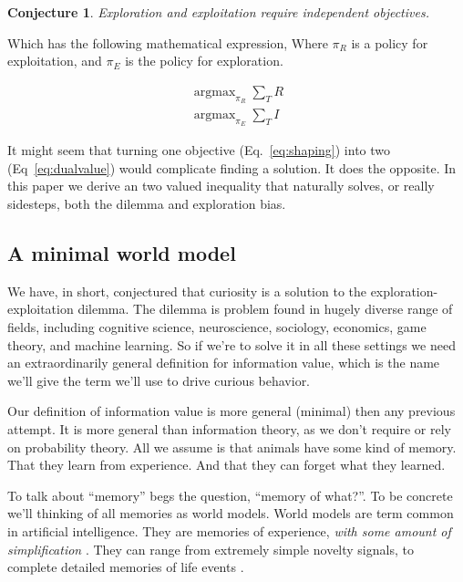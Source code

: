 \documentclass[9pt,lineno]{elife}
\DeclareMathOperator*{\argmax}{argmax}
\newtheorem{conjecture}{Conjecture}
\begin{document}
\begin{conjecture}
    \label{conj:3}
    Exploration and exploitation require independent objectives.
\end{conjecture}

Which has the following mathematical expression, Where $\pi_R$ is a policy for exploitation, and $\pi_E$ is the policy for exploration.

\begin{equation}
\label{eq:dualvalue}    
\begin{split}
\argmax_{\pi_R} \sum_T R \\
\argmax_{\pi_E} \sum_T I    
\end{split}
\end{equation}

It might seem that turning one objective (Eq.~\ref{eq:shaping}) into two (Eq~\ref{eq:dualvalue}) would complicate finding a solution. It does the opposite. In this paper we derive an two valued inequality that naturally solves, or really sidesteps, both the dilemma and exploration bias.

\subsection*{A minimal world model}
We have, in short, conjectured that curiosity is a solution to the exploration-exploitation dilemma. The dilemma is problem found in hugely diverse range of fields, including cognitive science, neuroscience, sociology, economics, game theory, and machine learning. So if we're to solve it in all these settings we need an extraordinarily general definition for information value, which is the name we'll give the term we'll use to drive curious behavior.

Our definition of information value is more general (minimal) then any previous attempt. It is more general than information theory, as we don't require or rely on probability theory. All we assume is that animals have some kind of memory. That they learn from experience. And that they can forget what they learned.

To talk about ``memory'' begs the question, ``memory of what?''. To be concrete we'll thinking of all memories as world models. World models are term common in artificial intelligence. They are memories of experience, \textit{with some amount of simplification} \cite{Schmidhuber1991,Ha2018}. They can range from extremely simple novelty signals, to complete detailed memories of life events \cite{Kakade2002,Bellemare2016,Dayan1993,Schmidhuber1991,Pathak2017,Friston2016,Yang2019,Lopes2012Miller1956,Tulving2002,Park2017,Itti2009,Friston2016,Tenenbaum2006,Kingma2013,Ganguli2008,Ha2018,Schmidhuber2015a,Mante2013}. 
\end{document}
